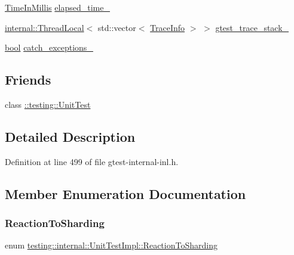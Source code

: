 \begin{DoxyCompactItemize}
\item 
\hyperlink{namespacetesting_1_1internal_a66a845df404b38fe85c5e14a069f255a}{Time\+In\+Millis} \hyperlink{classtesting_1_1internal_1_1UnitTestImpl_a06e0445298c6026bee71bb2bb7aae604}{elapsed\+\_\+time\+\_\+}
\item 
\hyperlink{classtesting_1_1internal_1_1ThreadLocal}{internal\+::\+Thread\+Local}$<$ std\+::vector$<$ \hyperlink{structtesting_1_1internal_1_1TraceInfo}{Trace\+Info} $>$ $>$ \hyperlink{classtesting_1_1internal_1_1UnitTestImpl_a73a797cf2b20129cb252b14c5fd9a0af}{gtest\+\_\+trace\+\_\+stack\+\_\+}
\item 
\hyperlink{classbool}{bool} \hyperlink{classtesting_1_1internal_1_1UnitTestImpl_a2cc0c6f466730b1d6e884738344b8e33}{catch\+\_\+exceptions\+\_\+}
\end{DoxyCompactItemize}
\subsection*{Friends}
\begin{DoxyCompactItemize}
\item 
class \hyperlink{classtesting_1_1internal_1_1UnitTestImpl_a893404438388dec058dc5c02e8f9a014}{\+::testing\+::\+Unit\+Test}
\end{DoxyCompactItemize}


\subsection{Detailed Description}


Definition at line 499 of file gtest-\/internal-\/inl.\+h.



\subsection{Member Enumeration Documentation}
\mbox{\label{classtesting_1_1internal_1_1UnitTestImpl_acc5ffd3f9bc2e87bb3dba4218f58af43}} 
\subsubsection{\texorpdfstring{Reaction\+To\+Sharding}{ReactionToSharding}}
{\footnotesize\ttfamily enum \hyperlink{classtesting_1_1internal_1_1UnitTestImpl_acc5ffd3f9bc2e87bb3dba4218f58af43}{testing\+::internal\+::\+Unit\+Test\+Impl\+::\+Reaction\+To\+Sharding}}

